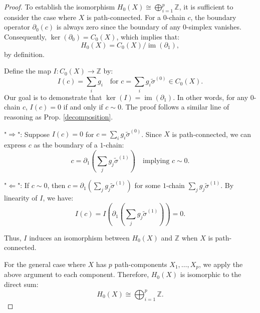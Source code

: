 \begin{proof}
    To establish the isomorphism $H_0(X) \cong \bigoplus_{i=1}^{p} \mathbb{Z}$, it is sufficient to consider the case where $X$ is path-connected. For a $0$-chain $c$, the boundary operator $\partial_0(c)$ is always zero since the boundary of any $0$-simplex vanishes. Consequently, $\ker(\partial_0) = C_0(X)$, which implies that:
    \[
        H_0(X) = C_0(X) / \operatorname{im}(\partial_1),
    \]
    by definition.

    Define the map $I: C_0(X) \to \mathbb{Z}$ by:
    \[
        I(c) = \sum_i g_i \quad \text{for } c = \sum_i g_i \tilde{\sigma}^{(0)} \in C_0(X).
    \]
    Our goal is to demonstrate that $\ker(I) = \operatorname{im}(\partial_1)$. In other words, for any $0$-chain $c$, $I(c) = 0$ if and only if $c \sim 0$. The proof follows a similar line of reasoning as Prop. \ref{decomposition}.

    "$\Rightarrow$": Suppose $I(c) = 0$ for $c = \sum_i g_i \tilde{\sigma}^{(0)}$. Since $X$ is path-connected, we can express $c$ as the boundary of a $1$-chain:
    \[
        c = \partial_1 \left( \sum_j g_j \tilde{\sigma}^{(1)} \right) \quad \text{implying } c \sim 0.
    \]

    "$\Leftarrow$": If $c \sim 0$, then $c = \partial_1 \left( \sum_j g_j \tilde{\sigma}^{(1)} \right)$ for some $1$-chain $\sum_j g_j \tilde{\sigma}^{(1)}$. By linearity of $I$, we have:
    \[
        I(c) = I \left( \partial_1 \left( \sum_j g_j \tilde{\sigma}^{(1)} \right) \right) = 0.
    \]

    Thus, $I$ induces an isomorphism between $H_0(X)$ and $\mathbb{Z}$ when $X$ is path-connected.

    For the general case where $X$ has $p$ path-components $X_1, \ldots, X_p$, we apply the above argument to each component. Therefore, $H_0(X)$ is isomorphic to the direct sum:
    \[
        H_0(X) \cong \bigoplus_{i=1}^{p} \mathbb{Z}.
    \]
\end{proof}

